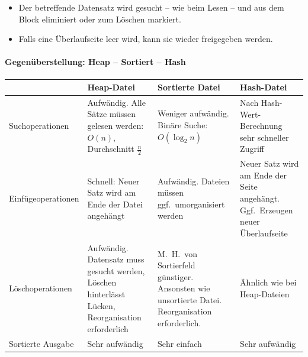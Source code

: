 \begin{frame}
\frametitle{\insertsection}
\framesubtitle{\insertsubsection}
\begin{itemize}
	\item Der betreffende Datensatz wird gesucht -- wie beim Lesen -- und aus dem Block eliminiert oder zum L\"oschen markiert. 
	\item Falls eine Überlaufseite leer wird, kann sie wieder freigegeben werden.
\end{itemize}
\end{frame}


\begin{frame}[t]
\framesubtitle{Gegenüberstellung: Heap -- Sortiert -- Hash}
{\small
	\begin{center}
		\begin{tabular}{|l|p{3cm}|p{3cm}|p{3cm}|}\hline
			& \textbf{Heap-Datei} & \textbf{Sortierte Datei} & \textbf{Hash-Datei}\\\hline
			Suchoperationen & Aufwändig. Alle S\"atze m\"ussen gelesen werden: $O(n)$, Durchschnitt $\frac{n}{2}$ 
			& Weniger aufwändig. Binäre Suche: $O(\log_2 n)$ & Nach Hash-Wert-Berechnung sehr schneller Zugriff\\\hline
			Einfügeoperationen & Schnell: Neuer Satz wird am Ende der Datei angeh\"angt 
			& Aufwändig. Dateien m\"ussen ggf.~umorganisiert werden 
			& Neuer Satz wird am Ende der Seite angeh\"angt. Ggf.~Erzeugen neuer \"Uberlaufseite\\\hline
			Löschoperationen & Aufwändig. Datensatz muss gesucht werden, Löschen hinterlässt Lücken, Reorganisation erforderlich 
			& M.~H.~von Sortierfeld günstiger. Ansonsten wie unsortierte Datei. Reorganisation erforderlich. 
			& \"Ahnlich wie bei Heap-Dateien\\\hline
			Sortierte Ausgabe & Sehr aufwändig & Sehr einfach & Sehr aufwändig \\\hline
		\end{tabular}
	\end{center}
}
\end{frame}

